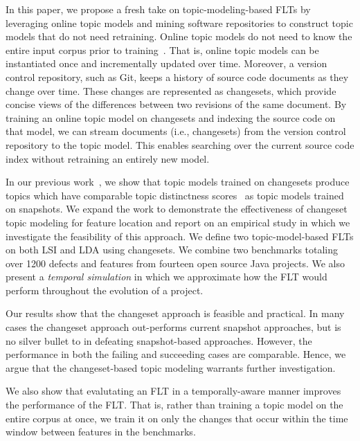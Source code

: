 In this paper, we propose a fresh take on topic-modeling-based FLTs by leveraging online topic models and mining software repositories to construct topic models that do not need retraining.
Online topic models do not need to know the entire input corpus prior to training~\cite{Hoffman-etal:2010,Radim:2011}.
That is, online topic models can be instantiated once and incrementally updated over time.
Moreover, a version control repository, such as Git, keeps a history of source code documents as they change over time.
These changes are represented as changesets, which provide concise views of the differences between two revisions of the same document.
By training an online topic model on changesets and indexing the source code on that model, we can stream documents (i.e., changesets) from the version control repository to the topic model.
This enables searching over the current source code index without retraining an entirely new model.

In our previous work~\cite{Corley-etal:2014}, we show that topic models trained on changesets produce topics which have comparable
topic distinctness scores~\cite{Thomas-etal:2011} as topic models trained on snapshots.
We expand the work to demonstrate the effectiveness of changeset topic modeling for feature location and report on an empirical study in which we investigate the feasibility of this approach.
We define two topic-model-based FLTs on both LSI and LDA using changesets.
We combine two benchmarks totaling over 1200 defects and features from fourteen open source Java projects.
We also present a \emph{temporal simulation} in which we approximate how the FLT would perform throughout the evolution of a project.

Our results show that the changeset approach is feasible and practical.
In many cases the changeset approach out-performs current snapshot approaches, but is no silver bullet to in defeating snapshot-based approaches.
However, the performance in both the failing and succeeding cases are comparable.
Hence, we argue that the changeset-based topic modeling warrants further investigation.

We also show that evalutating an FLT in a temporally-aware manner improves the performance of the FLT.
That is, rather than training a topic model on the entire corpus at once,
we train it on only the changes that occur within the time window between features in the benchmarks.

